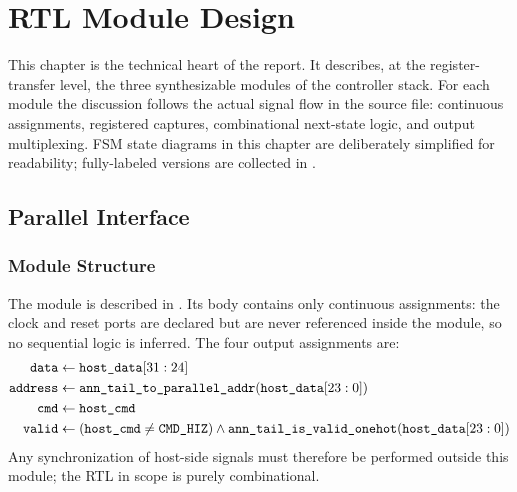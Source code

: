
\chapter{RTL Module Design}
\label{ch:rtl}

This chapter is the technical heart of the report. It describes, at the
register-transfer level, the three synthesizable modules of the controller
stack. For each module the discussion follows the actual signal flow in
the source file: continuous assignments, registered captures,
combinational next-state logic, and output multiplexing. FSM state
diagrams in this chapter are deliberately simplified for readability;
fully-labeled versions are collected in .

\section{Parallel Interface}
\label{sec:rtl-pi}

\subsection{Module Structure}
\label{sec:rtl-pi-structure}

The  module is described in
. Its body contains
only continuous assignments: the clock and reset ports are declared but
are never referenced inside the module, so no sequential logic is
inferred. The four output assignments are:
\begin{align*}
    \texttt{data}    &\leftarrow \texttt{host\_data}[31:24] \\
    \texttt{address} &\leftarrow \texttt{ann\_tail\_to\_parallel\_addr}(\texttt{host\_data}[23:0]) \\
    \texttt{cmd}     &\leftarrow \texttt{host\_cmd} \\
    \texttt{valid}   &\leftarrow (\texttt{host\_cmd} \neq \texttt{CMD\_HIZ})
                                   \land \texttt{ann\_tail\_is\_valid\_onehot}(\texttt{host\_data}[23:0])
\end{align*}
Any synchronization of host-side signals must therefore be performed
outside this module; the RTL in scope is purely combinational.

